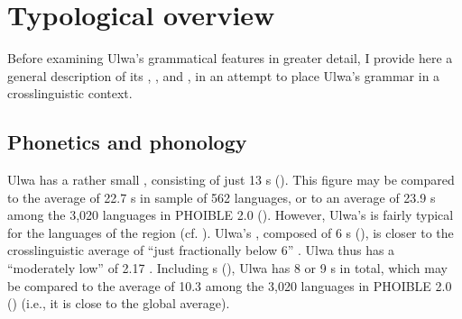 \section{Typological overview}\label{sec:1.8}

Before examining Ulwa’s grammatical features in greater detail, I provide here a general description of its , , and , in an attempt to place Ulwa’s grammar in a crosslinguistic context.

\subsection{Phonetics and phonology}\label{sec:1.8.1}


Ulwa has a rather small , consisting of just 13 s (). This figure may be compared to the average of 22.7 s in \linebreak {} sample of 562 languages, or to an average of 23.9 s among the 3,020 languages in PHOIBLE 2.0 (\citealt{MoranMcCloy2019}). However, Ulwa’s  is fairly typical for the languages of the region (cf. \cite[243]{Foley2018}). Ulwa’s , composed of 6 s (), is closer to the crosslinguistic average of “just fractionally below 6” \linebreak \citep{Maddieson2013b}. Ulwa thus has a “moderately low”  of 2.17 \citep{Maddieson2013c}. Including s (), Ulwa has 8 or 9 s in total, which may be compared to the average of 10.3 among the 3,020 languages in PHOIBLE 2.0 (\citealt{MoranMcCloy2019}) (i.e., it is close to the global average). \largerpage

